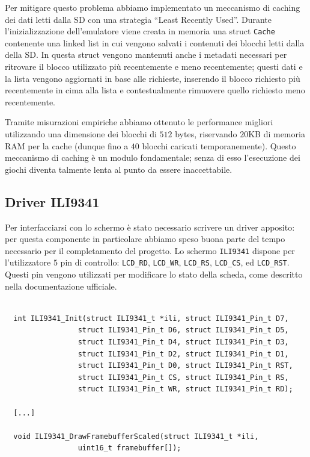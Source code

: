 \documentclass[hidelinks,12pt]{article}
\begin{document}
Per mitigare questo problema abbiamo implementato un meccanismo di caching dei
dati letti dalla SD con una strategia ``Least Recently Used''.
Durante l'inizializzazione dell'emulatore viene creata in memoria una struct
\texttt{Cache} contenente una linked list in cui vengono salvati i contenuti
dei blocchi letti dalla della SD.
In questa struct vengono mantenuti anche i metadati necessari per
ritrovare il blocco utilizzato più recentemente e meno recentemente; questi dati
e la lista vengono aggiornati in base alle richieste, inserendo il blocco
richiesto più recentemente in cima alla lista e contestualmente rimuovere quello
richiesto meno recentemente.

Tramite misurazioni empiriche abbiamo ottenuto le performance migliori
utilizzando una dimensione dei blocchi di $512$ bytes, riservando $20$KB di
memoria RAM per la cache (dunque fino a $40$ blocchi caricati temporanemente).
Questo meccanismo di caching è un modulo fondamentale; senza di esso l'esecuzione
dei giochi diventa talmente lenta al punto da essere inaccettabile.


\subsection{Driver ILI9341}
Per interfacciarsi con lo schermo è stato necessario scrivere un driver
apposito: per questa componente in particolare abbiamo speso buona parte del
tempo necessario per il completamento del progetto. Lo schermo \texttt{ILI9341}
dispone per l'utilizzatore $5$ pin di controllo: \texttt{LCD\_RD},
\texttt{LCD\_WR}, \texttt{LCD\_RS}, \texttt{LCD\_CS}, ed \texttt{LCD\_RST}.
Questi pin vengono utilizzati per modificare lo stato della scheda, come
descritto nella documentazione ufficiale.
\begin{table}[h]
	\begin{verbatim}

  int ILI9341_Init(struct ILI9341_t *ili, struct ILI9341_Pin_t D7,
                 struct ILI9341_Pin_t D6, struct ILI9341_Pin_t D5,
                 struct ILI9341_Pin_t D4, struct ILI9341_Pin_t D3,
                 struct ILI9341_Pin_t D2, struct ILI9341_Pin_t D1,
                 struct ILI9341_Pin_t D0, struct ILI9341_Pin_t RST,
                 struct ILI9341_Pin_t CS, struct ILI9341_Pin_t RS,
                 struct ILI9341_Pin_t WR, struct ILI9341_Pin_t RD);

  [...]

  void ILI9341_DrawFramebufferScaled(struct ILI9341_t *ili, 
                 uint16_t framebuffer[]);
  \end{verbatim}
	\caption{}
	\label{table:driver_ili}
\end{table}
\end{document}
